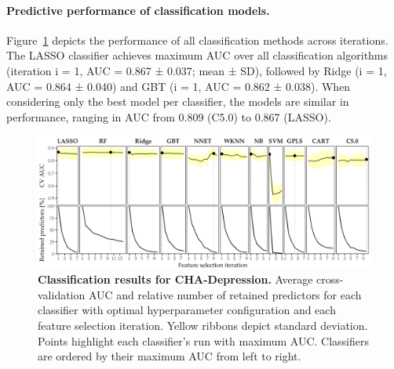 \documentclass[
  oneside]{book}
\begin{document}
\paragraph*{Predictive performance of classification models.}

Figure~\ref{fig:08-results-srep} depicts the performance of all classification methods across iterations.
The LASSO classifier achieves maximum AUC over all classification algorithms (iteration i = 1, AUC = 0.867 ± 0.037; mean ± SD), followed by Ridge (i = 1, AUC = 0.864 ± 0.040) and GBT (i = 1, AUC = 0.862 ± 0.038).
When considering only the best model per classifier, the models are similar in performance, ranging in AUC from 0.809 (C5.0) to 0.867 (LASSO).



\begin{figure}[htb]

{\centering \includegraphics[width=1\linewidth]{figures/08-results-srep} 

}

\caption{\textbf{Classification results for CHA-Depression.} Average cross-validation AUC and relative number of retained predictors for each classifier with optimal hyperparameter configuration and each feature selection iteration. Yellow ribbons depict standard deviation. Points highlight each classifier's run with maximum AUC. Classifiers are ordered by their maximum AUC from left to right.}\label{fig:08-results-srep}
\end{figure}
\end{document}
